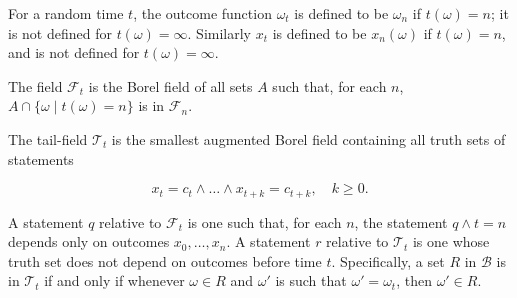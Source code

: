 For a random time $t$, the outcome function $\omega_t$ is defined to be $\omega_n$ if $t(\omega) = n$; it is not defined for $t(\omega) = \infty$. Similarly $x_t$ is defined to be $x_n(\omega)$ if $t(\omega) = n$, and is not defined for $t(\omega) = \infty$.

The field $\mathcal{F}_t$ is the Borel field of all sets $A$ such that, for each $n$, $A \cap \{\omega \mid t(\omega) = n\}$ is in $\mathcal{F}_n$.

The tail-field $\mathcal{T}_t$ is the smallest augmented Borel field containing all truth sets of statements

$$x_t = c_t \land \dots \land x_{t+k} = c_{t+k}, \quad k \geq 0.$$

A statement $q$ relative to $\mathcal{F}_t$ is one such that, for each $n$, the statement $q \land t = n$ depends only on outcomes $x_0, \dots, x_n$. A statement $r$ relative to $\mathcal{T}_t$ is one whose truth set does not depend on outcomes before time $t$. Specifically, a set $R$ in $\mathcal{B}$ is in $\mathcal{T}_t$ if and only if whenever $\omega \in R$ and $\omega'$ is such that $\omega' = \omega_t$, then $\omega' \in R$.
